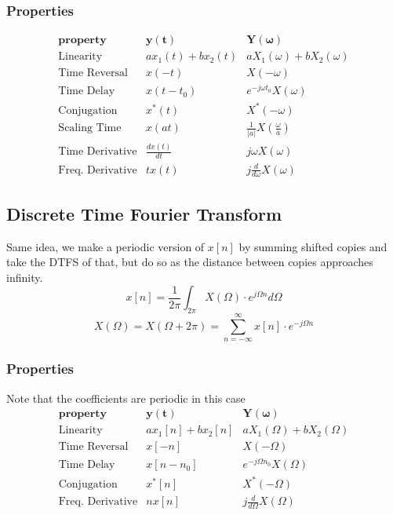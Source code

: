 \documentclass{article}
\begin{document}
\begin{multicols}{2}
\subsubsection{Properties}
\[
\begin{array}{rcc}
	\textbf{property} & \mathbf{y(t)} & \mathbf{Y(\omega)} \\
	\hline
	\text{Linearity} & ax_1(t) + bx_2(t) & aX_1(\omega) + bX_2(\omega) \\
	\text{Time Reversal} & x(-t) & X(-\omega) \\
	\text{Time Delay} & x(t-t_0) & e^{-j\omega t_0} X(\omega) \\
	\text{Conjugation} & x^*(t) & X^*(-\omega) \\
	\text{Scaling Time} & x(at) & \frac{1}{|a|}X\left(\frac{\omega}{a}\right) \\
	\text{Time Derivative} & \frac{dx(t)}{dt} & j\omega X(\omega) \\
	\text{Freq. Derivative} & tx(t) & j\frac{d}{d\omega} X(\omega)
\end{array}
\]

\subsection{Discrete Time Fourier Transform}
Same idea, we make a periodic version of $x[n]$ by summing shifted copies and take the DTFS of that, but do so as the distance between copies approaches infinity.
\[ x[n] = \frac{1}{2\pi}\int_{2\pi} X(\Omega) \cdot e^{j\Omega n} d\Omega \]
\[ X(\Omega) = X(\Omega + 2\pi) = \sum_{n=-\infty}^{\infty} x[n]\cdot e^{-j\Omega n} \]

\subsubsection{Properties}
Note that the coefficients are periodic in this case
\[
\begin{array}{rcc}
	\textbf{property} & \mathbf{y(t)} & \mathbf{Y(\omega)} \\
	\hline
	\text{Linearity} & ax_1[n] + bx_2[n] & aX_1(\Omega) + bX_2(\Omega) \\
	\text{Time Reversal} & x[-n] & X(-\Omega) \\
	\text{Time Delay} & x[n-n_0] & e^{-j\Omega n_0} X(\Omega) \\
	\text{Conjugation} & x^*[n] & X^*(-\Omega) \\
	\text{Freq. Derivative} & nx[n] & j\frac{d}{d\Omega} X(\Omega)
\end{array}
\]


\end{multicols}
\end{document}
